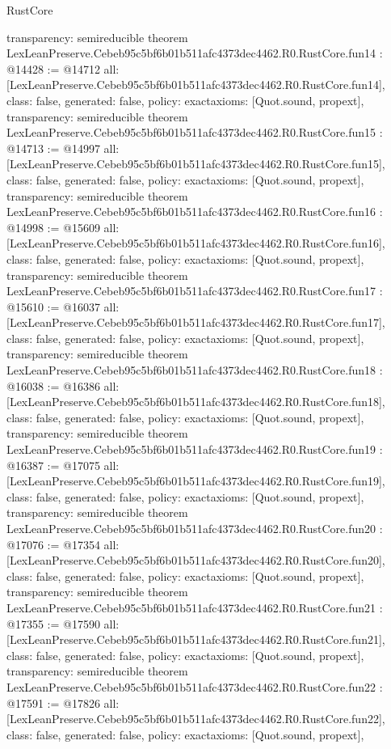 \begin{lexlean}{RustCore}
\begin{coremodule}
{  transparency: semireducible
}
theorem LexLeanPreserve.Cebeb95c5bf6b01b511afc4373dec4462.R0.RustCore.fun14 : @14428 := @14712 {
  all: [LexLeanPreserve.Cebeb95c5bf6b01b511afc4373dec4462.R0.RustCore.fun14],
  class: false,
  generated: false,
  policy: exact{axioms: [Quot.sound, propext]},
  transparency: semireducible
}
theorem LexLeanPreserve.Cebeb95c5bf6b01b511afc4373dec4462.R0.RustCore.fun15 : @14713 := @14997 {
  all: [LexLeanPreserve.Cebeb95c5bf6b01b511afc4373dec4462.R0.RustCore.fun15],
  class: false,
  generated: false,
  policy: exact{axioms: [Quot.sound, propext]},
  transparency: semireducible
}
theorem LexLeanPreserve.Cebeb95c5bf6b01b511afc4373dec4462.R0.RustCore.fun16 : @14998 := @15609 {
  all: [LexLeanPreserve.Cebeb95c5bf6b01b511afc4373dec4462.R0.RustCore.fun16],
  class: false,
  generated: false,
  policy: exact{axioms: [Quot.sound, propext]},
  transparency: semireducible
}
theorem LexLeanPreserve.Cebeb95c5bf6b01b511afc4373dec4462.R0.RustCore.fun17 : @15610 := @16037 {
  all: [LexLeanPreserve.Cebeb95c5bf6b01b511afc4373dec4462.R0.RustCore.fun17],
  class: false,
  generated: false,
  policy: exact{axioms: [Quot.sound, propext]},
  transparency: semireducible
}
theorem LexLeanPreserve.Cebeb95c5bf6b01b511afc4373dec4462.R0.RustCore.fun18 : @16038 := @16386 {
  all: [LexLeanPreserve.Cebeb95c5bf6b01b511afc4373dec4462.R0.RustCore.fun18],
  class: false,
  generated: false,
  policy: exact{axioms: [Quot.sound, propext]},
  transparency: semireducible
}
theorem LexLeanPreserve.Cebeb95c5bf6b01b511afc4373dec4462.R0.RustCore.fun19 : @16387 := @17075 {
  all: [LexLeanPreserve.Cebeb95c5bf6b01b511afc4373dec4462.R0.RustCore.fun19],
  class: false,
  generated: false,
  policy: exact{axioms: [Quot.sound, propext]},
  transparency: semireducible
}
theorem LexLeanPreserve.Cebeb95c5bf6b01b511afc4373dec4462.R0.RustCore.fun20 : @17076 := @17354 {
  all: [LexLeanPreserve.Cebeb95c5bf6b01b511afc4373dec4462.R0.RustCore.fun20],
  class: false,
  generated: false,
  policy: exact{axioms: [Quot.sound, propext]},
  transparency: semireducible
}
theorem LexLeanPreserve.Cebeb95c5bf6b01b511afc4373dec4462.R0.RustCore.fun21 : @17355 := @17590 {
  all: [LexLeanPreserve.Cebeb95c5bf6b01b511afc4373dec4462.R0.RustCore.fun21],
  class: false,
  generated: false,
  policy: exact{axioms: [Quot.sound, propext]},
  transparency: semireducible
}
theorem LexLeanPreserve.Cebeb95c5bf6b01b511afc4373dec4462.R0.RustCore.fun22 : @17591 := @17826 {
  all: [LexLeanPreserve.Cebeb95c5bf6b01b511afc4373dec4462.R0.RustCore.fun22],
  class: false,
  generated: false,
  policy: exact{axioms: [Quot.sound, propext]},
}
\end{coremodule}
\end{lexlean}
